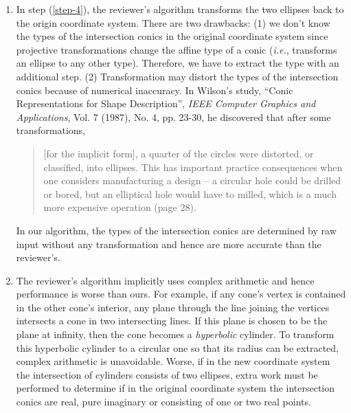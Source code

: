 \begin{enumerate}
          Thus, applying transformations to the original surfaces and then
          transforming the intersection curve back could have unexpected
          result.  Furthermore, in the new coordinate system, the reviewer's
          algorithm has to extract the axes of the cylinders.  Due to the
          effect of transformations, we are not sure whether a pair of
          non-intersecting axes are indeed intersecting in the original
          coordinate system.
          In our algorithm, since line intersection computations are used,
          which can be implemented accurately and have a meaningful geometric
          tolerance, we avoid using any transformation.

     \item In step (\ref{step-4}), the reviewer's algorithm transforms the two
          ellipses back to the origin coordinate system.
          There are two drawbacks: (1) we don't know the types of the
          intersection conics in the original coordinate system since
          projective transformations change the affine type of a conic
          ({\em i.e.}, transforms an ellipse to any other type).
          Therefore, we have to extract the type with an additional
          step. (2) Transformation may distort the types of the intersection
          conics because of numerical inaccuracy.  In Wilson's study,
          ``Conic Representations for Shape Description'',
          {\em IEEE Computer Graphics and Applications}, Vol. 7 (1987), No. 4,
          pp. 23-30, he discovered that after some transformations,
          \begin{quote}
               [for the implicit form], a quarter of the circles were distorted,
               or classified, into ellipses.  This has important practice
               consequences when one considers manufacturing a design -- a
               circular hole could be drilled or bored, but an elliptical
               hole would have to milled, which is a much more expensive
               operation (page 28).
          \end{quote}
          In our algorithm, the types of the intersection conics are
          determined by raw input without any transformation and hence
          are more accurate than the reviewer's.

     \item The reviewer's algorithm implicitly uses complex arithmetic and hence
          performance is worse than ours.  For example, if any cone's vertex
          is contained in the other cone's interior, any plane through the line
          joining the vertices intersects a cone in two intersecting lines.
          If this plane is chosen to be the plane at infinity, then the cone
          becomes a {\em hyperbolic} cylinder.  To transform this hyperbolic
          cylinder to a circular one so that its radius can be extracted,
          complex arithmetic is unavoidable.  Worse, if in the new coordinate
          system the intersection of cylinders consists of two ellipses,
          extra work must be performed to determine if in the original
          coordinate system the intersection conics are
          real, pure imaginary or consisting of one or two real points.


\end{enumerate}
